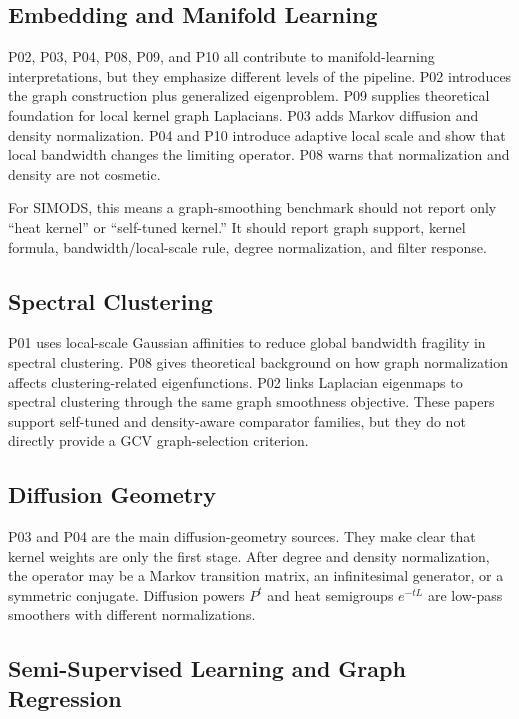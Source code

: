 \documentclass[11pt]{article}
\begin{document}
\subsection{Embedding and Manifold Learning}

P02, P03, P04, P08, P09, and P10 all contribute to manifold-learning
interpretations, but they emphasize different levels of the pipeline.  P02
introduces the graph construction plus generalized eigenproblem.  P09 supplies
theoretical foundation for local kernel graph Laplacians.  P03 adds Markov
diffusion and density normalization.  P04 and P10 introduce adaptive local
scale and show that local bandwidth changes the limiting operator.  P08 warns
that normalization and density are not cosmetic.

For SIMODS, this means a graph-smoothing benchmark should not report only
``heat kernel'' or ``self-tuned kernel.''  It should report graph support,
kernel formula, bandwidth/local-scale rule, degree normalization, and filter
response.

\subsection{Spectral Clustering}

P01 uses local-scale Gaussian affinities to reduce global bandwidth fragility
in spectral clustering.  P08 gives theoretical background on how graph
normalization affects clustering-related eigenfunctions.  P02 links
Laplacian eigenmaps to spectral clustering through the same graph smoothness
objective.  These papers support self-tuned and density-aware comparator
families, but they do not directly provide a GCV graph-selection criterion.

\subsection{Diffusion Geometry}

P03 and P04 are the main diffusion-geometry sources.  They make clear that
kernel weights are only the first stage.  After degree and density
normalization, the operator may be a Markov transition matrix, an infinitesimal
generator, or a symmetric conjugate.  Diffusion powers \(P^t\) and heat
semigroups \(e^{-tL}\) are low-pass smoothers with different normalizations.

\subsection{Semi-Supervised Learning and Graph Regression}
\end{document}

